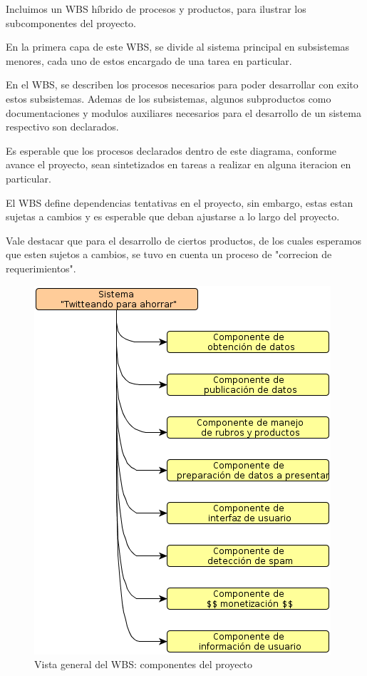 

\newcommand{\escaladefault}{0.85}

Incluimos un WBS híbrido de procesos y productos, para ilustrar los subcomponentes del proyecto. 

En la primera capa de este WBS, se divide al sistema principal en subsistemas menores, cada uno de estos encargado
de una tarea en particular.

En el WBS, se describen los procesos necesarios para poder desarrollar con exito estos subsistemas. Ademas 
de los subsistemas, algunos subproductos como documentaciones y modulos auxiliares necesarios para el desarrollo 
de un sistema respectivo son declarados.

Es esperable que los procesos declarados dentro de este diagrama, conforme avance el proyecto, sean sintetizados en tareas 
a realizar en alguna iteracion en particular.

El WBS define dependencias tentativas en el proyecto, sin embargo, estas estan sujetas a cambios y es esperable que deban 
ajustarse a lo largo del proyecto.

Vale destacar que para el desarrollo de ciertos productos, de los cuales esperamos que esten sujetos a cambios, se tuvo en 
cuenta un proceso de "correcion de requerimientos".

\begin{figure}[H]
\centering
\includegraphics[scale=\escaladefault]{graficos/wbs/primera_capa.png}
\caption{Vista general del WBS: componentes del proyecto}
\end{figure}

